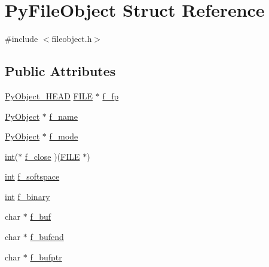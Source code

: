 \hypertarget{struct_py_file_object}{}\section{Py\+File\+Object Struct Reference}
\label{struct_py_file_object}


{\ttfamily \#include $<$fileobject.\+h$>$}

\subsection*{Public Attributes}
\begin{DoxyCompactItemize}
\item 
\mbox{\hyperlink{_python27_2object_8h_a0bf35c1f3ea13f925de94d8593db3b7e}{Py\+Object\+\_\+\+H\+E\+AD}} \mbox{\hyperlink{fileobject_8h_ae8a16e073fe79a434049ae0c07f71fd3}{F\+I\+LE}} $\ast$ \mbox{\hyperlink{struct_py_file_object_a02ca7b58e0cec7179aed1bc7facb859d}{f\+\_\+fp}}
\item 
\mbox{\hyperlink{_python27_2object_8h_aadc84ac7aed2cfa6f20c25f62bf3dac7}{Py\+Object}} $\ast$ \mbox{\hyperlink{struct_py_file_object_ae6978ee03201f40d41520d503fcc540b}{f\+\_\+name}}
\item 
\mbox{\hyperlink{_python27_2object_8h_aadc84ac7aed2cfa6f20c25f62bf3dac7}{Py\+Object}} $\ast$ \mbox{\hyperlink{struct_py_file_object_a536f2ba1896d8bbd6885b2f187036434}{f\+\_\+mode}}
\item 
\mbox{\hyperlink{warnings_8h_a74f207b5aa4ba51c3a2ad59b219a423b}{int}}($\ast$ \mbox{\hyperlink{struct_py_file_object_a3765ac4bab8a6a36eb97a096d1e65242}{f\+\_\+close}} )(\mbox{\hyperlink{fileobject_8h_ae8a16e073fe79a434049ae0c07f71fd3}{F\+I\+LE}} $\ast$)
\item 
\mbox{\hyperlink{warnings_8h_a74f207b5aa4ba51c3a2ad59b219a423b}{int}} \mbox{\hyperlink{struct_py_file_object_a22f995ddb150213ac2c8ca9212825c87}{f\+\_\+softspace}}
\item 
\mbox{\hyperlink{warnings_8h_a74f207b5aa4ba51c3a2ad59b219a423b}{int}} \mbox{\hyperlink{struct_py_file_object_a52749e0f0897fc4b6deb55cebc977e9b}{f\+\_\+binary}}
\item 
char $\ast$ \mbox{\hyperlink{struct_py_file_object_a2f658596cca7f408a1ed89752934f4a6}{f\+\_\+buf}}
\item 
char $\ast$ \mbox{\hyperlink{struct_py_file_object_a3f401303bf2674b1ab00abe3ccc84f35}{f\+\_\+bufend}}
\item 
char $\ast$ \mbox{\hyperlink{struct_py_file_object_afb479571227a1dbe6606a6a69267f443}{f\+\_\+bufptr}}

\end{DoxyCompactItemize}
